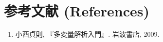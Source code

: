 \documentclass[dvipdfmx, 10pt]{beamer}
\begin{document}
\section*{参考文献 (References)}
\begin{frame}{\insertsection}
    \begin{enumerate}
        \item 小西貞則, 『多変量解析入門』. 岩波書店, 2009.
    \end{enumerate}
\end{frame}
\end{document}
